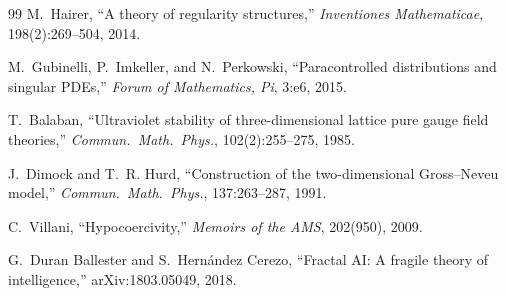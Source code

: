 \documentclass[12pt,a4paper]{article}
\theoremstyle{plain}
\theoremstyle{definition}
\theoremstyle{remark}
\begin{document}
\begin{thebibliography}{99}
M.~Hairer,
``A theory of regularity structures,''
\emph{Inventiones Mathematicae}, 198(2):269--504, 2014.

M.~Gubinelli, P.~Imkeller, and N.~Perkowski,
``Paracontrolled distributions and singular PDEs,''
\emph{Forum of Mathematics, Pi}, 3:e6, 2015.

T.~Balaban,
``Ultraviolet stability of three-dimensional lattice pure gauge field
theories,'' \emph{Commun.\ Math.\ Phys.}, 102(2):255--275, 1985.

J.~Dimock and T.~R. Hurd,
``Construction of the two-dimensional Gross--Neveu model,''
\emph{Commun.\ Math.\ Phys.}, 137:263--287, 1991.

C.~Villani,
``Hypocoercivity,''
\emph{Memoirs of the AMS}, 202(950), 2009.

G.~Duran Ballester and S.~Hern\'andez Cerezo,
``Fractal AI: A fragile theory of intelligence,''
arXiv:1803.05049, 2018.

\end{thebibliography}
\end{document}

